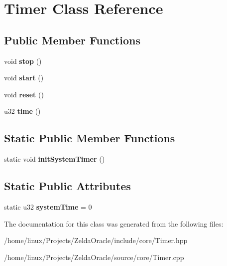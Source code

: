 \hypertarget{classTimer}{\section{Timer Class Reference}
\label{classTimer}
}
\subsection*{Public Member Functions}
\begin{DoxyCompactItemize}
\item 
\hypertarget{classTimer_a63f0eb44b27402196590a03781515dba}{void {\bfseries stop} ()}\label{classTimer_a63f0eb44b27402196590a03781515dba}

\item 
\hypertarget{classTimer_a3a8b5272198d029779dc9302a54305a8}{void {\bfseries start} ()}\label{classTimer_a3a8b5272198d029779dc9302a54305a8}

\item 
\hypertarget{classTimer_a9020542d73357a4eef512eefaf57524b}{void {\bfseries reset} ()}\label{classTimer_a9020542d73357a4eef512eefaf57524b}

\item 
\hypertarget{classTimer_a7715979fee128ff708344462375a169a}{u32 {\bfseries time} ()}\label{classTimer_a7715979fee128ff708344462375a169a}

\end{DoxyCompactItemize}
\subsection*{Static Public Member Functions}
\begin{DoxyCompactItemize}
\item 
\hypertarget{classTimer_af28f8e2d5ed47f8f18b2c61e549559bd}{static void {\bfseries init\+System\+Timer} ()}\label{classTimer_af28f8e2d5ed47f8f18b2c61e549559bd}

\end{DoxyCompactItemize}
\subsection*{Static Public Attributes}
\begin{DoxyCompactItemize}
\item 
\hypertarget{classTimer_a2754d03574ede5fbd1b496547cd8b47b}{static u32 {\bfseries system\+Time} = 0}\label{classTimer_a2754d03574ede5fbd1b496547cd8b47b}

\end{DoxyCompactItemize}


The documentation for this class was generated from the following files\+:\begin{DoxyCompactItemize}
\item 
/home/linux/\+Projects/\+Zelda\+Oracle/include/core/Timer.\+hpp\item 
/home/linux/\+Projects/\+Zelda\+Oracle/source/core/Timer.\+cpp\end{DoxyCompactItemize}
